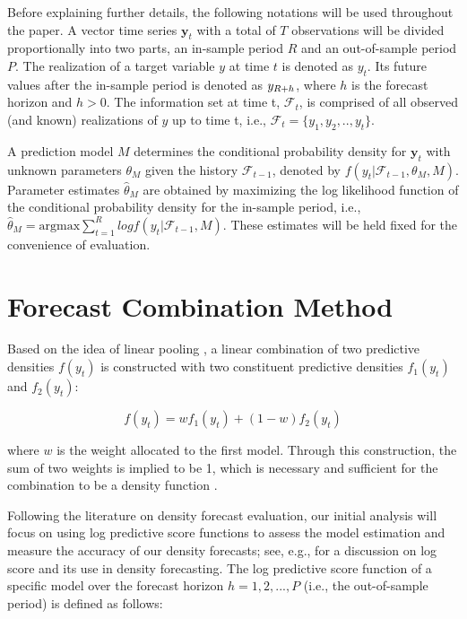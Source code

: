 \documentclass{monashthesis}
\begin{document}
Before explaining further details, the following notations will be used throughout the paper. A vector time series \(\textbf{y}_t\) with a total of \(T\) observations will be divided proportionally into two parts, an in-sample period \(R\) and an out-of-sample period \(P\). The realization of a target variable \(y\) at time \(t\) is denoted as \(y_{t}\). Its future values after the in-sample period is denoted as \(y_{\small{R+h}}\), where \(h\) is the forecast horizon and \(h>0\). The information set at time t, \(\mathcal{F}_t\), is comprised of all observed (and known) realizations of \(y\) up to time t, i.e., \(\mathcal{F}_t = \{y_1, y_2, .., y_t\}\).

A prediction model \(M\) determines the conditional probability density for \(\textbf{y}_t\) with unknown parameters \(\theta_M\) given the history \(\mathcal{F}_{t-1}\), denoted by \(f(y_t|\mathcal{F}_{t-1}, \theta_M, M)\). Parameter estimates \(\hat\theta_M\) are obtained by maximizing the log likelihood function of the conditional probability density for the in-sample period, i.e., \(\hat\theta_M = \text{argmax} \sum^R_{t=1} log f(y_t|\mathcal{F}_{t-1}, M)\). These estimates will be held fixed for the convenience of evaluation.

\hypertarget{forecast-combination-method}{%
\section{Forecast Combination Method}\label{forecast-combination-method}}

Based on the idea of linear pooling \autocite{BG69,HM07,GA11}, a linear combination of two predictive densities \(f(y_t)\) is constructed with two constituent predictive densities \(f_1(y_t)\) and \(f_2(y_t)\):

\begin{equation}
f(y_t) = wf_1(y_t) + (1-w)f_2(y_t)
\end{equation}

where \(w\) is the weight allocated to the first model. Through this construction, the sum of two weights is implied to be 1, which is necessary and sufficient for the combination to be a density function \autocite{GA11}.

Following the literature on density forecast evaluation, our initial analysis will focus on using log predictive score functions to assess the model estimation and measure the accuracy of our density forecasts; see, e.g., \textcite{GA11} for a discussion on log score and its use in density forecasting. The log predictive score function of a specific model over the forecast horizon \(h=1,2,...,P\) (i.e., the out-of-sample period) is defined as follows:
\end{document}
